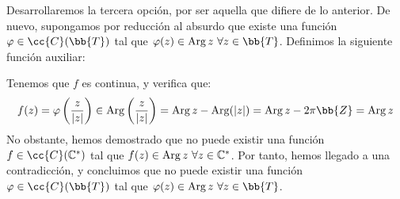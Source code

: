 \begin{ejercicio}
    Desarrollaremos la tercera opción, por ser aquella que difiere de lo anterior. De nuevo, supongamos por reducción al absurdo que existe una función $\varphi\in \cc{C}(\bb{T})$ tal que $\varphi(z)\in \Arg z~\forall z\in \bb{T}$. Definimos la siguiente función auxiliar:

    Tenemos que $f$ es continua, y verifica que:
    \begin{equation*}
        f(z) = \varphi\left(\frac{z}{|z|}\right) \in \Arg\left(\frac{z}{|z|}\right) = \Arg z - \Arg (|z|) = \Arg z - 2\pi\bb{Z} = \Arg z
    \end{equation*}
    No obstante, hemos demostrado que no puede existir una función $f\in \cc{C}(\mathbb{C}^{\ast})$ tal que $f(z)\in \operatorname{Arg} z~\forall z\in \mathbb{C}^{\ast}$. Por tanto, hemos llegado a una contradicción, y concluimos que no puede existir una función $\varphi\in \cc{C}(\bb{T})$ tal que $\varphi(z)\in \Arg z~\forall z\in \bb{T}$.

\end{ejercicio}

